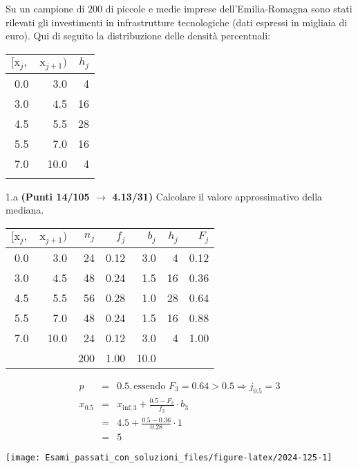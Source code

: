 \documentclass[
  11pt,
]{book}
\theoremstyle{mytheoremstyle}
\theoremstyle{mydefstyle}
\newenvironment{sol}
  {
  \begin{tcolorbox}[enhanced,breakable,arc=0.1mm,boxrule=1pt,colback=white,colframe=iblue,
  title=\bf \fontfamily{lmss}\selectfont \hspace{.5 cm} Soluzione,drop fuzzy shadow]

}{
\end{tcolorbox}
  }
\begin{document}
Su un campione di \(200\) di piccole e medie imprese dell'Emilia-Romagna sono stati rilevati gli investimenti in infrastrutture tecnologiche (dati espressi in migliaia di euro). Qui di seguito la distribuzione delle densità percentuali:

\begin{table}[H]
\centering
\begin{tabular}{rrr}
\toprule
$[\text{x}_j,$ & $\text{x}_{j+1})$ & $h_j$\\
\midrule
0.0 & 3.0 & 4\\
3.0 & 4.5 & 16\\
4.5 & 5.5 & 28\\
5.5 & 7.0 & 16\\
7.0 & 10.0 & 4\\
 &  & \\
\bottomrule
\end{tabular}
\end{table}

1.a \textbf{(Punti 14/105 \(\rightarrow\) 4.13/31)} Calcolare il valore approssimativo della mediana.

\begin{sol}

\begin{table}[H]
\centering
\begin{tabular}{rrrrrrr}
\toprule
$[\text{x}_j,$ & $\text{x}_{j+1})$ & $n_j$ & $f_j$ & $b_j$ & $h_j$ & $F_j$\\
\midrule
0.0 & 3.0 & 24 & 0.12 & 3.0 & 4 & 0.12\\
3.0 & 4.5 & 48 & 0.24 & 1.5 & 16 & 0.36\\
4.5 & 5.5 & 56 & 0.28 & 1.0 & 28 & 0.64\\
5.5 & 7.0 & 48 & 0.24 & 1.5 & 16 & 0.88\\
7.0 & 10.0 & 24 & 0.12 & 3.0 & 4 & 1.00\\
 &  & 200 & 1.00 & 10.0 &  & \\
\bottomrule
\end{tabular}
\end{table}

\begin{eqnarray*}
  p &=&  0.5 , \text{essendo }F_{ 3 }= 0.64  > 0.5  \Rightarrow j_{ 0.5 }= 3 \\
  x_{ 0.5 } &=& x_{\text{inf}; 3 } + \frac{ { 0.5 } - F_{ 2 }} {f_{ 3 }} \cdot b_{ 3 } \\
            &=&  4.5  + \frac {{ 0.5 } -  0.36 } { 0.28 } \cdot  1  \\
            &=&  5 
\end{eqnarray*}

\begin{center}\texttt{[image: Esami\_passati\_con\_soluzioni\_files/figure-latex/2024-125-1]} \end{center}

\end{sol}
\end{document}
